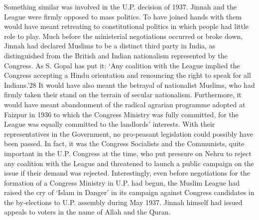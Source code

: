 \begin{multicols}{2}
Something similar was involved in the U.P. decision of 1937. Jinnah and the League were firmly opposed to mass politics. To have joined hands with them would have meant retreating to constitutional politics in which people had little role to play. Much before the ministerial negotiations occurred or broke down, Jinnah had declared Muslims to be a distinct third party in India, as distinguished from the British and Indian nationalism represented by the Congress. As S. Gopal has put it: `Any coalition with the League implied the Congress accepting a Hindu orientation and renouncing the right to speak for all Indians.'28 It would have also meant the betrayal of nationalist Muslims, who had firmly taken their stand on the terrain of secular nationalism. Furthermore, it would have meant abandonment of the radical agrarian programme adopted at Faizpur in 1936 to which the Congress Ministry was fully committed, for the League was equally committed to the landlords' interests. With their representatives in the Government, no pro-peasant legislation could possibly have been passed. In fact, it was the Congress Socialists and the Communists, quite important in the U.P. Congress at the time, who put pressure on Nehru to reject any coalition with the League and threatened to launch a public campaign on the issue if their demand was rejected. Interestingly, even before negotiations for the formation of a Congress Ministry in U.P. had begun, the Muslim League had raised the cry of `Islam in Danger' in its campaign against Congress candidates in the by-elections to U.P. assembly during May 1937. Jinnah himself had issued appeals to voters in the name of Allah and the Quran. 


\end{multicols}

